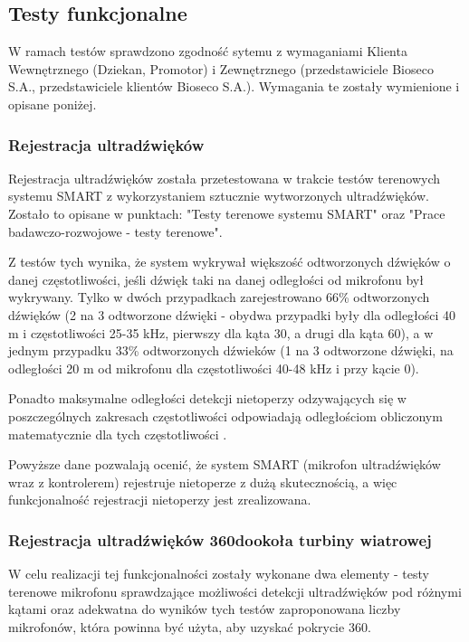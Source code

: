 \documentclass{sprz}
\begin{document}
\subsection{Testy funkcjonalne}
W ramach testów sprawdzono zgodność sytemu z wymaganiami Klienta Wewnętrznego (Dziekan, Promotor) i Zewnętrznego (przedstawiciele Bioseco S.A., przedstawiciele klientów Bioseco S.A.). Wymagania te zostały wymienione i opisane poniżej.

\subsubsection{Rejestracja ultradźwięków}
Rejestracja ultradźwięków została przetestowana w trakcie testów terenowych systemu SMART z wykorzystaniem sztucznie wytworzonych ultradźwięków. Zostało to opisane w punktach: "Testy terenowe systemu SMART" oraz "Prace badawczo-rozwojowe - testy terenowe". 

Z testów tych wynika, że system wykrywał większość odtworzonych dźwięków o danej częstotliwości, jeśli dźwięk taki na danej odległości od mikrofonu był wykrywany. Tylko w dwóch przypadkach zarejestrowano 66\% odtworzonych dźwięków (2 na 3 odtworzone dźwięki - obydwa przypadki były dla odległości 40 m i częstotliwości 25-35 kHz, pierwszy dla kąta 30\textdegree, a drugi dla kąta 60\textdegree ), a w jednym przypadku 33\% odtworzonych dźwieków (1 na 3 odtworzone dźwięki, na odległości 20 m od mikrofonu dla częstotliwości 40-48 kHz i przy kącie 0\textdegree).

Ponadto maksymalne odległości detekcji nietoperzy odzywających się w poszczególnych zakresach częstotliwości odpowiadają odległościom obliczonym matematycznie dla tych częstotliwości \cite{agranat}. 

Powyższe dane pozwalają ocenić, że system SMART (mikrofon ultradźwięków wraz z kontrolerem) rejestruje nietoperze z dużą skutecznością, a więc funkcjonalność rejestracji nietoperzy jest zrealizowana.

\subsubsection{Rejestracja ultradźwięków 360\textdegree dookoła turbiny wiatrowej}
W celu realizacji tej funkcjonalności zostały wykonane dwa elementy - testy terenowe mikrofonu sprawdzające możliwości detekcji ultradźwięków pod różnymi kątami oraz adekwatna do wyników tych testów zaproponowana liczby mikrofonów, która powinna być użyta, aby uzyskać pokrycie 360\textdegree. 
\end{document}
